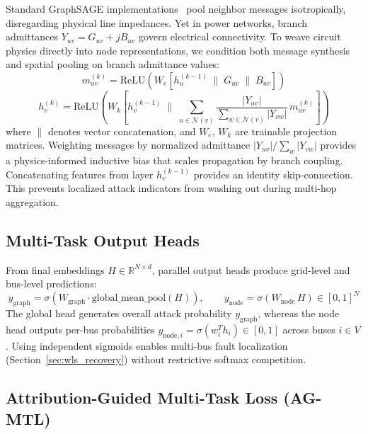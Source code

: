 \documentclass[runningheads]{llncs}
\begin{document}
Standard GraphSAGE implementations~\cite{hamilton2017inductive} pool neighbor messages isotropically, disregarding physical line impedances.
Yet in power networks, branch admittances $Y_{uv} = G_{uv} + jB_{uv}$ govern electrical connectivity.
To weave circuit physics directly into node representations, we condition both message synthesis and spatial pooling on branch admittance values:
\begin{equation}
m_{uv}^{(k)} = \mathrm{ReLU}\!\left( W_{e} \left[ h_{u}^{(k-1)} \;\big\|\; G_{uv} \;\big\|\; B_{uv} \right] \right)
\label{eq:message}
\end{equation}
\begin{equation}
h_{v}^{(k)} = \mathrm{ReLU}\!\left( W_{k} \left[ h_{v}^{(k-1)} \;\bigg\|\; \sum_{u \in \mathcal{N}(v)} \frac{|Y_{uv}|}{\sum_{w \in \mathcal{N}(v)} |Y_{vw}|}\, m_{uv}^{(k)} \right] \right)
\label{eq:agg}
\end{equation}
where $\|$ denotes vector concatenation, and $W_{e}$, $W_{k}$ are trainable projection matrices.
Weighting messages by normalized admittance $|Y_{uv}| / \sum_{w} |Y_{vw}|$ provides a physics-informed inductive bias that scales propagation by branch coupling.
Concatenating features from layer $h_{v}^{(k-1)}$ provides an identity skip-connection.
This prevents localized attack indicators from washing out during multi-hop aggregation.

\subsection{Multi-Task Output Heads}

From final embeddings $H \in \mathbb{R}^{N \times d}$, parallel output heads produce grid-level and bus-level predictions:
\begin{equation}
y_{\mathrm{graph}} = \sigma\!\left(W_{\mathrm{graph}} \cdot \mathrm{global\_mean\_pool}(H)\right), \qquad y_{\mathrm{node}} = \sigma(W_{\mathrm{node}}\, H) \in [0, 1]^{N}
\label{eq:heads}
\end{equation}
The global head generates overall attack probability $y_{\mathrm{graph}}$, whereas the node head outputs per-bus probabilities $y_{\mathrm{node},i} = \sigma(w_i^T h_i) \in [0, 1]$ across buses $i \in V$.
Using independent sigmoids enables multi-bus fault localization (Section~\ref{sec:wls_recovery}) without restrictive softmax competition.

\subsection{Attribution-Guided Multi-Task Loss (AG-MTL)}
\label{sec:agmtl}
\end{document}

